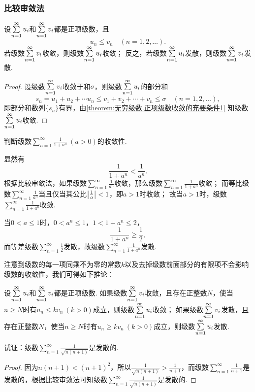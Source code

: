 \subsubsection{比较审敛法}
\begin{theorem}[比较审敛法]\label{theorem:无穷级数.正项级数的比较审敛法}
设\(\s u_i\)和\(\s v_i\)都是正项级数，且\[
u_n \leqslant v_n \quad (n=1,2,\dotsc).
\]
若级数\(\s v_i\)收敛，则级数\(\s u_i\)收敛；
反之，若级数\(\s u_i\)发散，则级数\(\s v_i\)发散.
\begin{proof}
设级数\(\s v_i\)收敛于和\(\sigma\)，则级数\(\s u_i\)的部分和\[
s_n = u_1 + u_2 + \dotsb u_n
\leqslant
v_1 + v_2 + \dotsb + v_n \leqslant \sigma
\quad (n=1,2,\dotsc),
\]即部分和数列\(\{s_n\}\)有界，由\cref{theorem:无穷级数.正项级数收敛的充要条件1} 知级数\(\s u_i\)收敛.
\end{proof}
\end{theorem}

\begin{example}
\def\s{\sum\limits_{n=1}^{\infty}}
判断级数\(\s \frac{1}{1+a^n}\ (a>0)\)的收敛性.
\begin{solution}
显然有\[
\frac{1}{1+a^n} < \frac{1}{a^n}.
\]根据比较审敛法，如果级数\(\s \frac{1}{a^n}\)收敛，那么级数\(\s \frac{1}{1+a^n}\)收敛；
而等比级数\(\s \frac{1}{a^n}\)当且仅当其公比\(\abs{\frac{1}{a}} < 1\)，即\(a > 1\)时收敛；
故当\(a > 1\)时，级数\(\s \frac{1}{1+a^n}\)收敛.

当\(0 < a \leqslant 1\)时，\(0 < a^n \leqslant 1\)，\(1 < 1 + a^n \leqslant 2\)，\[
\frac{1}{1+a^n} \geqslant \frac{1}{2},
\]而等差级数\(\s \frac{1}{2}\)发散，故级数\(\s \frac{1}{1+a^n}\)发散.
\end{solution}
\end{example}

注意到级数的每一项同乘不为零的常数\(k\)以及去掉级数前面部分的有限项不会影响级数的收敛性，我们可得如下推论：
\begin{corollary}\label{theorem:无穷级数.正项级数的比较审敛法的推论}
设\(\s u_i\)和\(\s v_i\)都是正项级数.
如果级数\(\s v_i\)收敛，且存在正整数\(N\)，使当\(n \geqslant N\)时有\(u_n \leqslant k v_n\ (k > 0)\)成立，则级数\(\s u_i\)收敛；
如果级数\(\s v_i\)发散，且存在正整数\(N\)，使当\(n \geqslant N\)时有\(u_n \geqslant k v_n\ (k > 0)\)成立，则级数\(\s u_i\)发散.
\end{corollary}

\begin{example}
试证：级数\(\sum\limits_{n=1}^{\infty}\frac{1}{\sqrt{n(n+1)}}\)是发散的.
\begin{proof}
因为\(n(n+1) < (n+1)^2\)，所以\(\frac{1}{\sqrt{n(n+1)}} > \frac{1}{n+1}\)，而级数\(\sum\limits_{n=1}^{\infty}\frac{1}{n+1}\)是发散的，根据比较审敛法可知级数\(\sum\limits_{n=1}^{\infty}\frac{1}{\sqrt{n(n+1)}}\)是发散的.
\end{proof}
\end{example}

